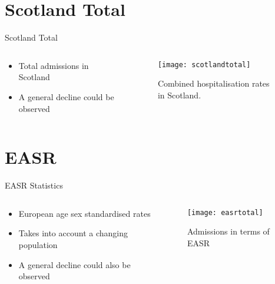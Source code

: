 \documentclass[hyperref={breaklinks,colorlinks,
   urlcolor=blue,citecolor=blue,linkcolor=red}]{beamer}
\begin{document}
\section{Scotland Total}
\begin{frame}{Scotland Total}
\begin{columns}
\begin{column}{0.4\textwidth}
\begin{itemize}
\item{Total admissions in Scotland}
\item{A general decline could be observed}
\end{itemize}
\end{column}

\begin{column}{0.7\textwidth}
\begin{figure}
\begin{center}
\texttt{[image: scotlandtotal]}
\caption{Combined hospitalisation rates in Scotland.}
\end{center}
\end{figure}
\end{column}
\end{columns}
\end{frame}

\section{EASR}
\begin{frame}{EASR Statistics}
\begin{columns}
\begin{column}{0.4\textwidth}
\begin{itemize}
\item{European age sex standardised rates}
\item{Takes into account a changing population}
\item{A general decline could also be observed}
\end{itemize}
\end{column}

\begin{column}{0.7\textwidth}
\begin{figure}
\begin{center}
\texttt{[image: easrtotal]}
\caption{Admissions in terms of EASR}
\end{center}
\end{figure}
\end{column}
\end{columns}
\end{frame}
\end{document}
